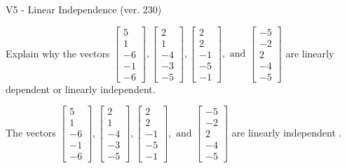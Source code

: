 \begin{exercise}
  \begin{exerciseTitle}V5 - Linear Independence (ver. 230)\end{exerciseTitle}
  \begin{exerciseStatement}
    Explain why the vectors \(\left[\begin{array}{r}
5 \\
1 \\
-6 \\
-1 \\
-6
\end{array}\right] , \left[\begin{array}{r}
2 \\
1 \\
-4 \\
-3 \\
-5
\end{array}\right] , \left[\begin{array}{r}
2 \\
2 \\
-1 \\
-5 \\
-1
\end{array}\right] , \text{ and } \left[\begin{array}{r}
-5 \\
-2 \\
2 \\
-4 \\
-5
\end{array}\right]\) are linearly dependent or linearly independent.	


  \end{exerciseStatement}
  \begin{exerciseAnswer}
   The vectors \(\left[\begin{array}{r}
5 \\
1 \\
-6 \\
-1 \\
-6
\end{array}\right] , \left[\begin{array}{r}
2 \\
1 \\
-4 \\
-3 \\
-5
\end{array}\right] , \left[\begin{array}{r}
2 \\
2 \\
-1 \\
-5 \\
-1
\end{array}\right] , \text{ and } \left[\begin{array}{r}
-5 \\
-2 \\
2 \\
-4 \\
-5
\end{array}\right]\) are 
  	 linearly independent  .
  


  \end{exerciseAnswer}
\end{exercise}